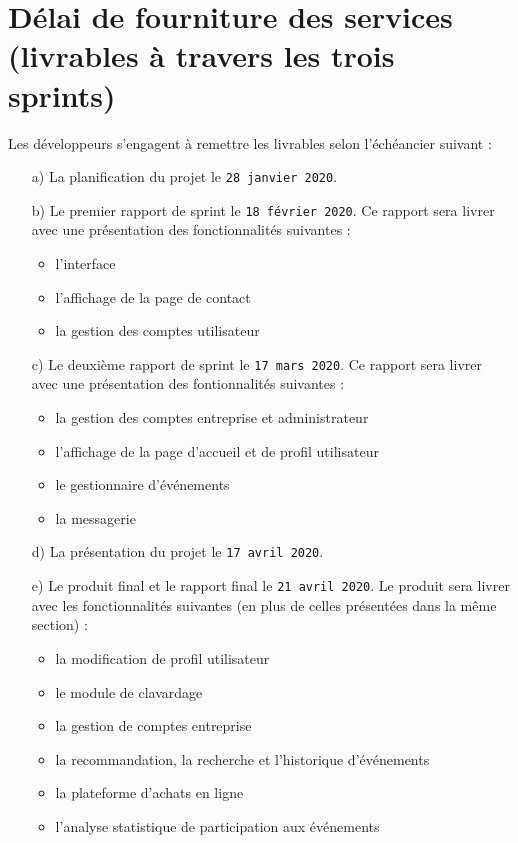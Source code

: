 \documentclass[letter,12pt]{exam}
\begin{document}
\section{Délai de fourniture des services\\ (livrables à travers les
trois
sprints)}

Les développeurs s'engagent à remettre les livrables selon l'échéancier
suivant :

\begin{itemize}
\tightlist
\item[a)]
  La planification du projet le \texttt{28\ janvier\ 2020}.
\item[b)]
  Le premier rapport de sprint le \texttt{18\ février\ 2020}. Ce rapport
  sera livrer avec une présentation des fonctionnalités suivantes :

  \begin{itemize}
  \tightlist
  \item
    l'interface
  \item
    l'affichage de la page de contact
  \item
    la gestion des comptes utilisateur
  \end{itemize}
\item[c)]
  Le deuxième rapport de sprint le \texttt{17\ mars\ 2020}. Ce rapport
  sera livrer avec une présentation des fontionnalités suivantes :

  \begin{itemize}
  \tightlist
  \item
    la gestion des comptes entreprise et administrateur
  \item
    l'affichage de la page d'accueil et de profil utilisateur
  \item
    le gestionnaire d'événements
  \item
    la messagerie
  \end{itemize}
\item[d)]
  La présentation du projet le \texttt{17\ avril\ 2020}.
\item[e)]
  Le produit final et le rapport final le \texttt{21\ avril\ 2020}. Le
  produit sera livrer avec les fonctionnalités suivantes (en plus de
  celles présentées dans la même section) :

  \begin{itemize}
  \tightlist
  \item
    la modification de profil utilisateur
  \item
    le module de clavardage
  \item
    la gestion de comptes entreprise
  \item
    la recommandation, la recherche et l'historique d'événements
  \item
    la plateforme d'achats en ligne
  \item
    l'analyse statistique de participation aux événements
  \end{itemize}
\end{itemize}
\end{document}
